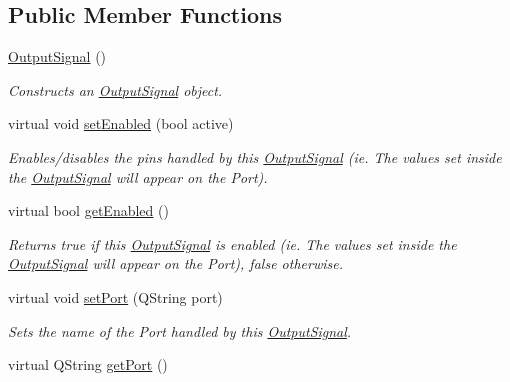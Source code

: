 \subsection*{Public Member Functions}
\begin{DoxyCompactItemize}
\item 
\hyperlink{struct_picto_1_1_output_signal_ad30bf5beee68cd41bdc4edf0c75bdbfd}{Output\-Signal} ()
\begin{DoxyCompactList}\small\item\em Constructs an \hyperlink{struct_picto_1_1_output_signal}{Output\-Signal} object. \end{DoxyCompactList}\item 
\hypertarget{struct_picto_1_1_output_signal_a1db08b9ca1e1c360ea50598fdc4d7c15}{virtual void \hyperlink{struct_picto_1_1_output_signal_a1db08b9ca1e1c360ea50598fdc4d7c15}{set\-Enabled} (bool active)}\label{struct_picto_1_1_output_signal_a1db08b9ca1e1c360ea50598fdc4d7c15}

\begin{DoxyCompactList}\small\item\em Enables/disables the pins handled by this \hyperlink{struct_picto_1_1_output_signal}{Output\-Signal} (ie. The values set inside the \hyperlink{struct_picto_1_1_output_signal}{Output\-Signal} will appear on the Port). \end{DoxyCompactList}\item 
\hypertarget{struct_picto_1_1_output_signal_a0d83ecaba4667407896d4fc8526fdd7a}{virtual bool \hyperlink{struct_picto_1_1_output_signal_a0d83ecaba4667407896d4fc8526fdd7a}{get\-Enabled} ()}\label{struct_picto_1_1_output_signal_a0d83ecaba4667407896d4fc8526fdd7a}

\begin{DoxyCompactList}\small\item\em Returns true if this \hyperlink{struct_picto_1_1_output_signal}{Output\-Signal} is enabled (ie. The values set inside the \hyperlink{struct_picto_1_1_output_signal}{Output\-Signal} will appear on the Port), false otherwise. \end{DoxyCompactList}\item 
virtual void \hyperlink{struct_picto_1_1_output_signal_a7996c66ede372d437199adbda75f95a5}{set\-Port} (Q\-String port)
\begin{DoxyCompactList}\small\item\em Sets the name of the Port handled by this \hyperlink{struct_picto_1_1_output_signal}{Output\-Signal}. \end{DoxyCompactList}\item 
\hypertarget{struct_picto_1_1_output_signal_a3e555bb9dbceaf9686d522b24ab3ed13}{virtual Q\-String \hyperlink{struct_picto_1_1_output_signal_a3e555bb9dbceaf9686d522b24ab3ed13}{get\-Port} ()}\label{struct_picto_1_1_output_signal_a3e555bb9dbceaf9686d522b24ab3ed13}


\end{DoxyCompactItemize}
